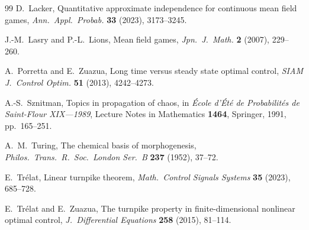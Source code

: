 \documentclass[11pt]{amsart}
\theoremstyle{definition}
\theoremstyle{remark}
\begin{document}
\begin{thebibliography}{99}
D.~Lacker,
Quantitative approximate independence for continuous mean field games,
\emph{Ann.\ Appl.\ Probab.} \textbf{33} (2023), 3173--3245.

J.-M.~Lasry and P.-L.~Lions,
Mean field games,
\emph{Jpn.\ J.\ Math.} \textbf{2} (2007), 229--260.

A.~Porretta and E.~Zuazua,
Long time versus steady state optimal control,
\emph{SIAM J.\ Control Optim.} \textbf{51} (2013), 4242--4273.

A.-S.~Sznitman,
Topics in propagation of chaos,
in \emph{\'Ecole d'\'Et\'e de Probabilit\'es de Saint-Flour XIX---1989},
Lecture Notes in Mathematics \textbf{1464}, Springer, 1991, pp.~165--251.

A.~M.~Turing,
The chemical basis of morphogenesis,
\emph{Philos.\ Trans.\ R.\ Soc.\ London Ser.\ B} \textbf{237} (1952), 37--72.

E.~Tr\'elat,
Linear turnpike theorem,
\emph{Math.\ Control Signals Systems} \textbf{35} (2023), 685--728.

E.~Tr\'elat and E.~Zuazua,
The turnpike property in finite-dimensional nonlinear optimal control,
\emph{J.\ Differential Equations} \textbf{258} (2015), 81--114.

\end{thebibliography}
\end{document}

